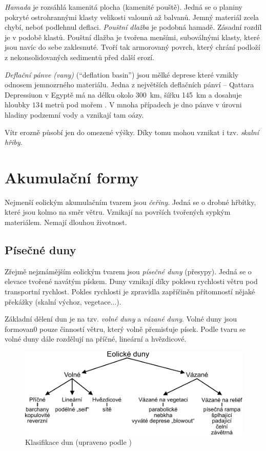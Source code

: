 \emph{Hamada} je rozsáhlá kamenitá plocha (kamenité pouště). Jedná se o planiny pokryté ostrohrannými klasty velikosti valounů až balvanů. Jemný materiál zcela chybí, neboť podlehnul deflaci. \emph{Pouštní dlažba} je podobná hamadě. Zásadní rozdíl je v podobě klastů. Pouštní dlažba je tvořena menšími, suboválnými klasty, které jsou navíc do sebe zaklesnuté. Tvoří tak armorovaný povrch, který chrání podloží z nekonsolidovaných sedimentů před další erozí. 

\emph{Deflační pánve (vany)} (\enquote{deflation basin}) jsou mělké deprese které vznikly odnosem jemnozrného materiálu. Jedna z největších deflačních pánví -- Qattara Depressiuon v Egyptě má na délku okolo \SI{300}{\kilo\metre}, šířku \SI{145}{\kilo\metre} a dosahuje hloubky $134$ metrů pod mořem \parencite{albrittonOriginQattaraDepression1990}. V mnoha případech je dno pánve v úrovni hladiny podzemní vody a vznikají tam oázy. 

Vítr erozně působí jen do omezené výšky. Díky tomu mohou vznikat i tzv. \emph{skalní hřiby}.

\section{Akumulační formy}
Nejmenší eolickým akumulačním tvarem jsou \emph{čeřiny}. Jedná se o drobné hřbítky, které jsou kolmo na směr větru. Vznikají na površích tvořených sypkým materiálem. Nemají dlouhou životnost. 

\subsection{Písečné duny}
Zřejmě nejznámějším eolickým tvarem jsou \emph{písečné duny} (přesypy). Jedná se o elevace tvořené navátým pískem. Duny vznikají díky poklesu rychlosti větru pod transportní rychlost. Pokles rychlosti je zpravidla zapříčiněn přítomností nějaké překážky (skalní výchoz, vegetace...). 

Základní dělení dun je na tzv. \emph{volné duny} a \emph{vázané duny}. Volné duny jsou formovan0 pouze činností větru, který volně přemisťuje písek. Podle tvaru se volné duny dále rozdělují na příčné, lineární a hvězdicové. 

\begin{figure}
	\centering
	\includegraphics[width=1\linewidth]{obrazky/eolicka/typy_dun}
	\caption{Klasifikace dun (upraveno podle \textcite{livingstoneAeolianGeomorphologyNew2019})}
	\label{fig:typdun}
\end{figure}

